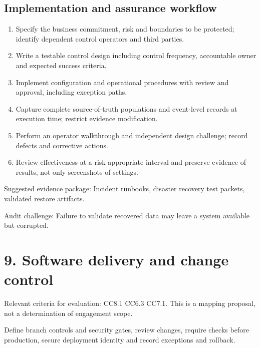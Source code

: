 \documentclass[10pt,oneside]{report}
\begin{document}
\subsection{Implementation and assurance workflow}
\begin{enumerate}
\item Specify the business commitment, risk and boundaries to be protected; identify dependent control operators and third parties.
\item Write a testable control design including control frequency, accountable owner and expected success criteria.
\item Implement configuration and operational procedures with review and approval, including exception paths.
\item Capture complete source-of-truth populations and event-level records at execution time; restrict evidence modification.
\item Perform an operator walkthrough and independent design challenge; record defects and corrective actions.
\item Review effectiveness at a risk-appropriate interval and preserve evidence of results, not only screenshots of settings.
\end{enumerate}

Suggested evidence package: Incident runbooks, disaster recovery test packets, validated restore artifacts.

Audit challenge: Failure to validate recovered data may leave a system available but corrupted.

\section{9. Software delivery and change control}
Relevant criteria for evaluation: CC8.1 CC6.3 CC7.1. This is a mapping proposal, not a determination of engagement scope.

\begin{engineeringbox}
Define branch controls and security gates, review changes, require checks before production, secure deployment identity and record exceptions and rollback.
\end{engineeringbox}
\end{document}

